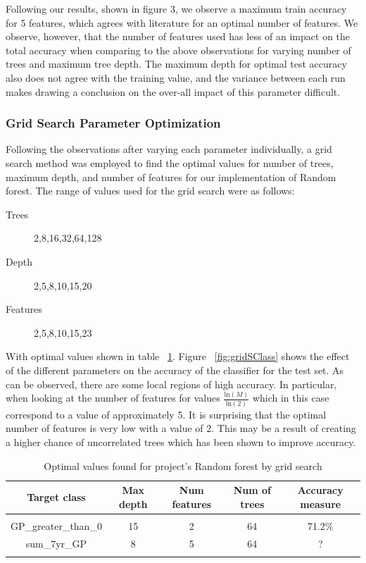 \documentclass{article} %
\begin{document}
Following our results, shown in figure 3, we observe a maximum train accuracy for 5 features, which agrees with literature for an optimal number of features. We observe, however, that the number of features used has less of an impact on the total accuracy when comparing to the above observations for varying number of trees and maximum tree depth. The maximum depth for optimal test accuracy also does not agree with the training value, and the variance between each run makes drawing a conclusion on the over-all impact of this parameter difficult.

\subsubsection{Grid Search Parameter Optimization}

Following the observations after varying each parameter individually, a grid search method was employed to find the optimal values for number of trees, maximum depth, and number of features for our implementation of Random forest. The range of values used for the grid search were as follows:

\begin{description}
\item [Trees] 2,8,16,32,64,128
\item [Depth] 2,5,8,10,15,20
\item [Features] 2,5,8,10,15,23
\end{description}

With optimal values shown in table ~\ref{opt-table}. Figure ~\ref{fig:gridSClass} shows the effect of the different parameters on the accuracy of the classifier for the test set. As can be observed, there are some local regions of high accuracy. In particular, when looking at the number of features for values $\frac{\text{ln}(M)}{\text{ln}(2)}$ which in this case correspond to a value of approximately 5. It is surprising that the optimal number of features is very low with a value of 2. This may be a result of creating a higher chance of uncorrelated trees which has been shown to improve accuracy. \cite{Bharathidason2014}

\begin{table}[h]
\caption{Optimal values found for project's Random forest by grid search}
\begin{center}
\begin{tabular}{ccccc}
{\bf Target class} &{\bf Max depth} &{\bf Num features} &{\bf Num of trees}&{\bf Accuracy measure}
\\ \hline \\
GP\_greater\_than\_0         &15	&2	&64 &71.2\%\\
sum\_7yr\_GP         &8	&5	&64 &?\\
\label{opt-table}
\end{tabular}
\end{center}
\end{table}
\end{document}

